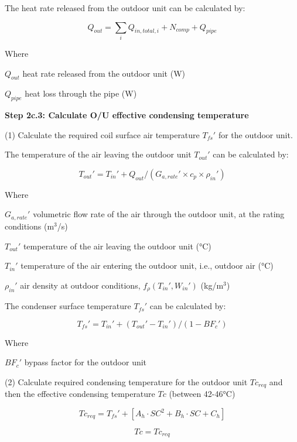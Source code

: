 The heat rate released from the outdoor unit can be calculated by:

\begin{equation}Q_{out}=\sum_iQ_{in,total,i}+N_{comp}+Q_{pipe}\end{equation} 

Where

$Q_{out}$	heat rate released from the outdoor unit (W)

$Q_{pipe}$ 	heat loss through the pipe (W)

\textbf{Step 2c.3: Calculate O/U effective condensing temperature} 

 (1) Calculate the required coil surface air temperature ${T_{fs}}'$ for the outdoor unit.

The temperature of the air leaving the outdoor unit ${T_{out}}'$ can be calculated by:
 
\begin{equation}{T_{out}}'={T_{in}}'+Q_{out}/({G_{a,rate}}'\times{c_p}\times{{\rho_{in}}'})\end{equation}
 
Where

${G_{a,rate}}'$ volumetric flow rate of the air through the outdoor unit, at the rating conditions (m\(^3\)/s)

${T_{out}}'$ temperature of the air leaving the outdoor unit (°C)

${T_{in}}'$	temperature of the air entering the outdoor unit, i.e., outdoor air (°C)

${\rho_{in}}'$ air density at outdoor conditions, $f_{\rho}({T_{in}}',{W_{in}}')$ (kg/m\(^3\))

The condenser surface temperature ${T_{fs}}'$ can be calculated by:
 
\begin{equation}{T_{fs}}'={T_{in}}'+({T_{out}}'-{T_{in}}')/(1-{BF_c}')\end{equation}
 
Where

${BF_c}'$ 	bypass factor for the outdoor unit  

(2) Calculate required condensing temperature for the outdoor unit $Tc_{req}$ and then the effective condensing temperature $Tc$ (between 42-46°C)
 
\begin{equation}Tc_{req}={T_{fs}}'+[A_h\cdot SC^2+B_h\cdot SC+C_h]\end{equation}

\begin{equation}Tc=Tc_{req}\end{equation}

